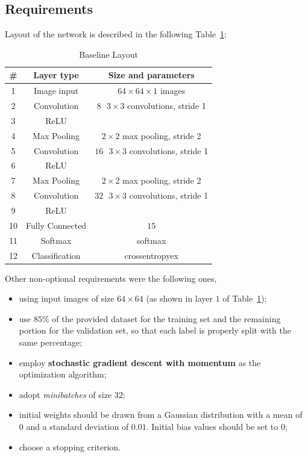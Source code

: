 \documentclass[a4paper, 11pt]{article} %
\begin{document}
\subsection{Requirements}
Layout of the network is described in the following Table~\ref{tab:baseline-layout}:
\bigskip

\begin{table}[ht]
\centering
\begin{tabular}{|c|c|c|}
\hline 
\textbf{\#} & \textbf{Layer type} & \textbf{Size and parameters} \\
\hline \hline 
1 & Image input & $64 \times 64 \times 1$ images \\
\hline 
2 & Convolution & $8 \mbox{ } 3 \times 3$ convolutions, stride 1 \\
\hline 
3 & ReLU &  \\
\hline 
4 & Max Pooling & $2 \times 2$ max pooling, stride 2 \\
\hline
5 & Convolution & $16 \mbox{ } 3 \times 3$ convolutions, stride 1 \\
\hline 
6 & ReLU &  \\
\hline 
7 & Max Pooling & $2 \times 2$ max pooling, stride 2 \\
\hline
8 & Convolution & $32 \mbox{ } 3 \times 3$ convolutions, stride 1 \\
\hline 
9 & ReLU & \\
\hline 
10 & Fully Connected & $15$ \\
\hline
11 & Softmax & softmax \\ 
\hline 
12 & Classification & crossentropyex \\
\hline
\end{tabular}
\caption{Baseline Layout}\label{tab:baseline-layout}
\end{table}
\bigskip

Other non-optional requirements were the following ones,

\begin{itemize}
    \item using input images of size $64 \times 64$ (as shown in layer $1$ of Table~\ref{tab:baseline-layout});
    \item use $85\%$ of the provided dataset for the training set and the remaining portion for the validation set, so that each label is properly split with the same percentage;
    \item employ \textbf{stochastic gradient descent with momentum} as the optimization algorithm;
    \item adopt \emph{minibatches} of size $32$;
    \item initial weights should be drawn from a Gaussian distribution with a mean of $0$ and a standard deviation of $0.01$. Initial bias values should be set to $0$;
    \item choose a stopping criterion.
\end{itemize}
\end{document}
